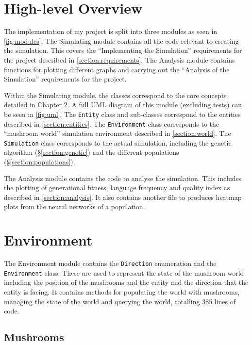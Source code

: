 \documentclass[12pt,a4paper]{report}
\begin{document}
\section{High-level Overview}\label{section:impl-high}

The implementation of my project is split into three modules as seen in \cref{fig:modules}. The Simulating module contains all the code relevant to creating the simulation. This covers the ``Implementing the Simulation'' requirements for the project described in \cref{section:requirements}. The Analysis module contains functions for plotting different graphs and carrying out the ``Analysis of the Simulation'' requirements for the project.

Within the Simulating module, the classes correspond to the core concepts detailed in Chapter 2. A full UML diagram of this module (excluding tests) can be seen in \cref{fig:uml}. The \texttt{Entity} class and sub-classes correspond to the entities described in \cref{section:entities}. The \texttt{Environment} class corresponds to the ``mushroom world'' simulation environment described in \cref{section:world}. The \texttt{Simulation} class corresponds to the actual simulation, including the genetic algorithm (\S\ref{section:genetic}) and the different populations (\S\ref{section:populations}).

The Analysis module contains the code to analyse the simulation. This includes the plotting of generational fitness, language frequency and quality index as described in \cref{section:analysis}. It also contains another file to produces heatmap plots from the neural networks of a population.

\section{Environment}\label{section:impl-env}

The Environment module contains the \texttt{Direction} enumeration and the \texttt{Environment} class. These are used to represent the state of the mushroom world including the position of the mushrooms and the entity and the direction that the entity is facing. It contains methods for populating the world with mushrooms, managing the state of the world and querying the world, totalling 385 lines of code.

\subsection{Mushrooms}\label{section:mushrooms}
\end{document}
